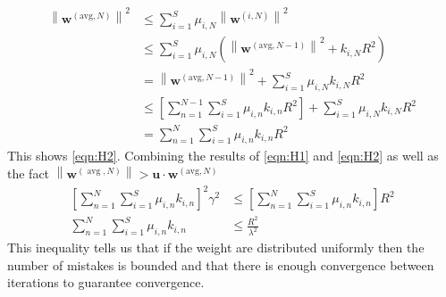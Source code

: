 \begingroup
\allowdisplaybreaks
\begin{align*}
    \left\|\mathbf{w}^{(\mathrm{avg}, N)}\right\|^{2} &\leq \sum_{i=1}^{S} \mu_{i, N}\left\|\mathbf{w}^{(i, N)}\right\|^{2} \\
    &\leq \sum_{i=1}^{S} \mu_{i, N}\left(\left\|\mathbf{w}^{(\mathrm{avg}, N-1)}\right\|^{2}+k_{i, N} R^{2}\right) \\
    &= \left\|\mathbf{w}^{(\mathrm{avg}, N-1)}\right\|^{2}+\sum_{i=1}^{S} \mu_{i, N} k_{i, N} R^{2} \\
    &\leq \left[\sum_{n=1}^{N-1} \sum_{i=1}^{S} \mu_{i, n} k_{i, n} R^{2}\right]+\sum_{i=1}^{S} \mu_{i, N} k_{i, N} R^{2} \\
    &= \sum_{n=1}^{N} \sum_{i=1}^{S} \mu_{i, n} k_{i, n} R^{2}
\end{align*}
\endgroup
This shows \ref{eqn:H2}. Combining the results of \ref{eqn:H1} and \ref{eqn:H2} as well as the fact $\left\|\mathbf{w}^{(\operatorname{avg}, N)}\right\|>\mathbf{u} \cdot \mathbf{w}^{(\mathrm{avg}, N)}$
\begin{align*}
    \left[\sum_{n=1}^{N} \sum_{i=1}^{S} \mu_{i, n} k_{i, n}\right]^{2} \gamma^{2} &\leq \left[\sum_{n=1}^{N} \sum_{i=1}^{S} \mu_{i, n} k_{i, n}\right] R^{2} \\
    \sum_{n=1}^{N} \sum_{i=1}^{S} \mu_{i, n} k_{i, n} &\leq \frac{R^2}{\lambda^2}
\end{align*}
This inequality tells us that if the weight are distributed uniformly then the number of mistakes is bounded and that there is enough convergence between iterations to guarantee convergence.